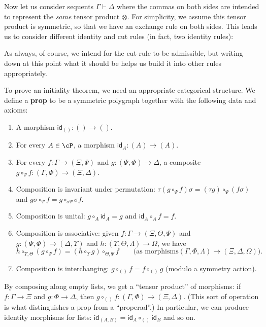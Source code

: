 \documentclass{book}
\def\idfunc{\mathsf{id}}
\let\types\vdash
\let\tensor\otimes
\begin{document}
Now let us consider sequents $\Gamma\types\Delta$ where the commas on both sides are intended to represent the \emph{same} tensor product $\tensor$.
For simplicity, we assume this tensor product is symmetric, so that we have an exchange rule on both sides.
This leads us to consider different identity and cut rules (in fact, two identity rules):
As always, of course, we intend for the cut rule to be admissible, but writing down at this point what it should be helps us build it into other rules appropriately.

To prove an initiality theorem, we need an appropriate categorical structure.
We define a \textbf{prop} to be a symmetric polygraph \cP together with the following data and axioms:
\begin{enumerate}
\item A morphism $\idfunc_{()}:()\to ()$.
\item For every $A\in\cP$, a morphism $\idfunc_A :(A)\to (A)$.
\item For every $f:\Gamma\to (\Xi,\Psi)$ and $g:(\Psi,\Phi)\to \Delta$, a composite $g\circ_\Psi f : (\Gamma,\Phi) \to (\Xi,\Delta)$.
\item Composition is invariant under permutation: $\tau(g\circ_\Psi f)\sigma = (\tau g)\circ_\Psi (f\sigma)$ and $g\sigma \circ_\Psi f = g\circ_{\sigma \Psi} \sigma f$.
\item Composition is unital:
  $g\circ_A \idfunc_A = g$ and $\idfunc_A\circ_A f = f$.
\item Composition is associative: given $f:\Gamma\to (\Xi,\Theta,\Psi)$ and $g:(\Psi,\Phi)\to (\Delta,\Upsilon)$ and $h:(\Upsilon,\Theta,\Lambda)\to \Omega$, we have
  \[h \circ_{\Upsilon,\Theta} (g\circ_\Psi f) = (h\circ_\Upsilon g) \circ_{\Theta,\Psi} f \qquad \text{(as morphisms} (\Gamma,\Phi,\Lambda) \to (\Xi,\Delta,\Omega)). \]
\item Composition is interchanging: $g\circ_{()}f = f\circ_{()}g$ (modulo a symmetry action).
\end{enumerate}
By composing along empty lists, we get a ``tensor product'' of morphisms: if $f:\Gamma\to\Xi$ and $g:\Phi\to\Delta$, then $g\circ_{()}f : (\Gamma,\Phi) \to (\Xi,\Delta)$.
(This sort of operation is what distinguishes a prop from a ``properad''.)
In particular, we can produce identity morphisms for lists: $\idfunc_{(A,B)} = \idfunc_A \circ_{()} \idfunc_B$ and so on.
\end{document}
